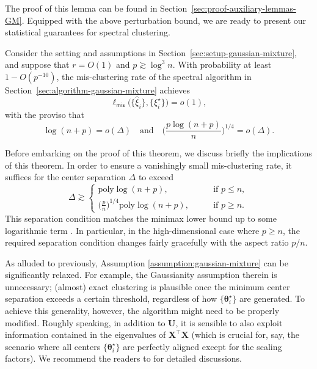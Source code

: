 %
The proof of this lemma can be found in Section~\ref{sec:proof-auxiliary-lemmas-GM}.
Equipped with the above perturbation bound, we are ready to present our statistical guarantees for spectral clustering.
%
\begin{theorem}
	\label{thm:GMM-performance}
	Consider the setting and assumptions in Section~\ref{sec:setup-gaussian-mixture}, and suppose that $r=O(1)$ and $p\gtrsim \log^3 n$.
	With probability at least $1-O(p^{-10})$, the mis-clustering rate of the spectral algorithm in Section~\ref{sec:algorithm-gaussian-mixture} achieves
	 $$ \ell_{\mathsf{mis}}\big(\{\widehat{\xi}_{i}\},\{\xi_{i}^{\star}\}\big) = o(1) ,$$
	with the proviso that
	\begin{equation}
		\log(n+p)=o(\Delta)\quad\text{and}\quad\Big(\frac{p\log(n+p)}{n}\Big)^{1/4}=o(\Delta).
		\label{eq:condition-Delta-thm-GMM}
	\end{equation} 	
\end{theorem}
%

Before embarking on the proof of this theorem, we discuss briefly the implications of this theorem.
 In order to ensure a vanishingly small mis-clustering rate, it suffices for the center separation $\Delta$ to exceed
%
\[
	\Delta\gtrsim \begin{cases}
		\mathrm{poly}\log(n+p), & \text{if }p\leq n,\\
		\big(\frac{p}{n}\big)^{1/4} \mathrm{poly}\log(n+p),\qquad & \text{if }p\geq n.
	\end{cases}
\]
%
This separation condition matches the minimax lower bound  up to some logarithmic term \citep{cai2018rate,ndaoud2018sharp}.
In particular,  in the high-dimensional case where $p\geq n$, the required separation condition changes fairly gracefully with the aspect ratio $p/n$.

\begin{remark}\label{remark:assumptions_gmm}
	As alluded to previously, Assumption \ref{assumption:gaussian-mixture} can be significantly relaxed. For example,
	the Gaussianity assumption therein is unnecessary; (almost) exact clustering is plausible once the minimum center separation exceeds a certain threshold,
	regardless of how $\{\bm{\theta}_i^{\star}\}$ are generated.
	To achieve this generality, however, the algorithm might need to be properly modified. Roughly speaking, in addition to $\bm{U}$,
	it is sensible to also exploit information contained in the eigenvalues of $\bm{X}^{\top}\bm{X}$
	(which is crucial for, say, the scenario where all centers $\{\bm{\theta}_i^{\star}\}$ are perfectly aligned except for the scaling factors).
	We recommend the readers to \citet{loffler2019optimality} for detailed discussions.
\end{remark}



